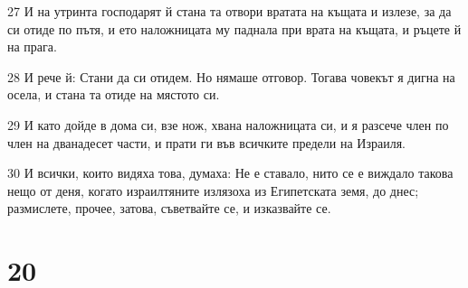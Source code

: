 \par 27 И на утринта господарят й стана та отвори вратата на къщата и излезе, за да си отиде по пътя, и ето наложницата му паднала при врата на къщата, и ръцете й на прага.
\par 28 И рече й: Стани да си отидем. Но нямаше отговор. Тогава човекът я дигна на осела, и стана та отиде на мястото си.
\par 29 И като дойде в дома си, взе нож, хвана наложницата си, и я разсече член по член на дванадесет части, и прати ги във всичките предели на Израиля.
\par 30 И всички, които видяха това, думаха: Не е ставало, нито се е виждало такова нещо от деня, когато израилтяните излязоха из Египетската земя, до днес; размислете, прочее, затова, съветвайте се, и изказвайте се.

\chapter{20}


